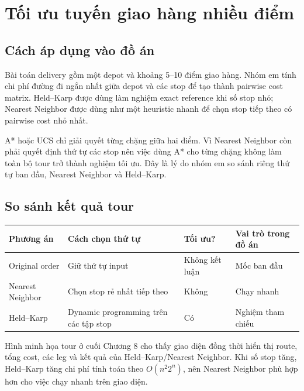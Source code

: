 \section{Tối ưu tuyến giao hàng nhiều điểm}
\subsection{Cách áp dụng vào đồ án}
Bài toán delivery gồm một depot và khoảng 5--10 điểm giao hàng. Nhóm em tính chi phí đường đi ngắn nhất giữa depot và các stop để tạo thành pairwise cost matrix. Held--Karp được dùng làm nghiệm exact reference khi số stop nhỏ; Nearest Neighbor được dùng như một heuristic nhanh để chọn stop tiếp theo có pairwise cost nhỏ nhất.

A* hoặc UCS chỉ giải quyết từng chặng giữa hai điểm. Vì Nearest Neighbor còn phải quyết định thứ tự các stop nên việc dùng A* cho từng chặng không làm toàn bộ tour trở thành nghiệm tối ưu. Đây là lý do nhóm em so sánh riêng thứ tự ban đầu, Nearest Neighbor và Held--Karp.

\subsection{So sánh kết quả tour}
\begin{center}
{\small
\begin{tabular}{l l l l}
\toprule
Phương án & Cách chọn thứ tự & Tối ưu? & Vai trò trong đồ án\\
\midrule
Original order & Giữ thứ tự input & Không kết luận & Mốc ban đầu\\
Nearest Neighbor & Chọn stop rẻ nhất tiếp theo & Không & Chạy nhanh\\
Held--Karp & Dynamic programming trên các tập stop & Có & Nghiệm tham chiếu\\
\bottomrule
\end{tabular}
}
\end{center}

Hình minh họa tour ở cuối Chương 8 cho thấy giao diện đồng thời hiển thị route, tổng cost, các leg và kết quả của Held--Karp/Nearest Neighbor. Khi số stop tăng, Held--Karp tăng chi phí tính toán theo \(O(n^2 2^n)\), nên Nearest Neighbor phù hợp hơn cho việc chạy nhanh trên giao diện.
